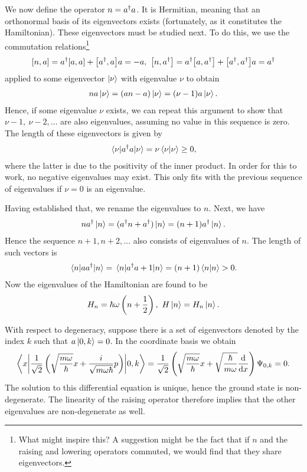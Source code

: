 We now define the operator $n = a^{\dagger}a$. It is Hermitian, meaning that an orthonormal basis of its eigenvectors exists (fortunately, as it constitutes the Hamiltonian). These eigenvectors must be studied next. To do this, we use the commutation relations\footnote{What might inspire this? A suggestion might be the fact that if $n$ and the raising and lowering operators commuted, we would find that they share eigenvectors.}
\begin{align*}
	\comm{n}{a} = \adj{a}\comm{a}{a} + \comm{\adj{a}}{a}a = -a,\ \comm{n}{\adj{a}} = \adj{a}\comm{a}{\adj{a}} + \comm{\adj{a}}{\adj{a}}a = \adj{a}
\end{align*}
applied to some eigenvector $\ket{\nu}$ with eigenvalue $\nu$ to obtain
\begin{align*}
	na\ket{\nu} = (an - a)\ket{\nu} = (\nu - 1)a\ket{\nu}.
\end{align*}
Hence, if some eigenvalue $\nu$ exists, we can repeat this argument to show that $\nu - 1,\ \nu - 2, \dots$ are also eigenvalues, assuming no value in this sequence is zero. The length of these eigenvectors is given by
\begin{align*}
	\expval{a^{\dagger}a}{\nu} = \nu\braket{\nu} \geq 0,
\end{align*}
where the latter is due to the positivity of the inner product. In order for this to work, no negative eigenvalues may exist. This only fits with the previous sequence of eigenvalues if $\nu = 0$ is an eigenvalue.

Having established that, we rename the eigenvalues to $n$. Next, we have
\begin{align*}
	na^{\dagger}\ket{n} = (a^{\dagger}n + a^{\dagger})\ket{n} = (n + 1)a^{\dagger}\ket{n}.
\end{align*}
Hence the sequence $n + 1, n + 2, \dots$ also consists of eigenvalues of $n$. The length of such vectors is
\begin{align*}
	\expval{aa^{\dagger}}{n} = \expval{a^{\dagger}a + 1}{n} = (n + 1)\braket{n} > 0.
\end{align*}
Now the eigenvalues of the Hamiltonian are found to be
\begin{align*}
	H_{n} = \hbar\omega\left(n + \frac{1}{2}\right),\ H\ket{n} = H_{n}\ket{n}.
\end{align*}

With respect to degeneracy, suppose there is a set of eigenvectors denoted by the index $k$ such that $a\ket{0, k} = 0$. In the coordinate basis we obtain
\begin{align*}
	\mel**{x}{\frac{1}{\sqrt{2}}\left(\sqrt{\frac{m\omega}{\hbar}}x + \frac{i}{\sqrt{m\omega\hbar}}p\right)}{0, k} = \frac{1}{\sqrt{2}}\left(\sqrt{\frac{m\omega}{\hbar}}x + \sqrt{\frac{\hbar}{m\omega}}\dv{x}\right)\Psi_{0, k} = 0.
\end{align*}
The solution to this differential equation is unique, hence the ground state is non-degenerate. The linearity of the raising operator therefore implies that the other eigenvalues are non-degenerate as well.

